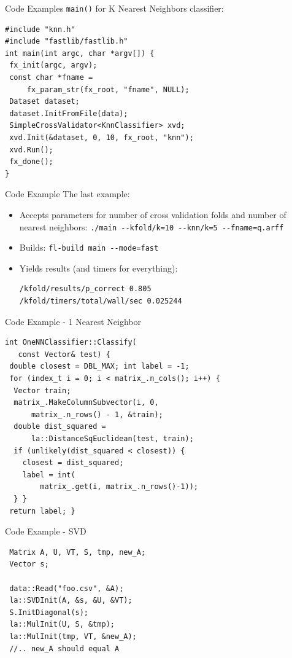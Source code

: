 \documentclass[pdf,colorBG,slideColor]{prosper}
\begin{document}
\begin{slide}{Code Examples}
 {\tt main()} for K Nearest Neighbors classifier:
 \vspace*{.1in}
\begin{verbatim}
#include "knn.h"
#include "fastlib/fastlib.h"
int main(int argc, char *argv[]) {
 fx_init(argc, argv);
 const char *fname =
     fx_param_str(fx_root, "fname", NULL);
 Dataset dataset;
 dataset.InitFromFile(data);
 SimpleCrossValidator<KnnClassifier> xvd;
 xvd.Init(&dataset, 0, 10, fx_root, "knn");
 xvd.Run();
 fx_done();
}
\end{verbatim}
\end{slide}

\begin{slide}{Code Example}
 \vspace*{.3in}
 The last example: \\
 \begin{itemize}
 \item Accepts parameters for number of cross validation folds and number
 of nearest neighbors: \verb|./main --kfold/k=10 --knn/k=5 --fname=q.arff|
 \item Builds: \verb|fl-build main --mode=fast|
 \item Yields results (and timers for everything):
\begin{verbatim}
/kfold/results/p_correct 0.805
/kfold/timers/total/wall/sec 0.025244
\end{verbatim}
 \end{itemize}
\end{slide}

\begin{slide}{Code Example - 1 Nearest Neighbor}
 \vspace{-.17in}
\begin{verbatim}
int OneNNClassifier::Classify(
   const Vector& test) {
 double closest = DBL_MAX; int label = -1;
 for (index_t i = 0; i < matrix_.n_cols(); i++) {
  Vector train;
  matrix_.MakeColumnSubvector(i, 0,
      matrix_.n_rows() - 1, &train);
  double dist_squared =
      la::DistanceSqEuclidean(test, train);
  if (unlikely(dist_squared < closest)) {
    closest = dist_squared;
    label = int(
        matrix_.get(i, matrix_.n_rows()-1));
  } }
 return label; }
\end{verbatim}
\end{slide}

\begin{slide}{Code Example - SVD}
\vspace{-.17in}
\begin{verbatim}
 Matrix A, U, VT, S, tmp, new_A;
 Vector s;

 data::Read("foo.csv", &A);
 la::SVDInit(A, &s, &U, &VT);
 S.InitDiagonal(s);
 la::MulInit(U, S, &tmp);
 la::MulInit(tmp, VT, &new_A);
 //.. new_A should equal A
\end{verbatim}
\end{slide}
\end{document}
